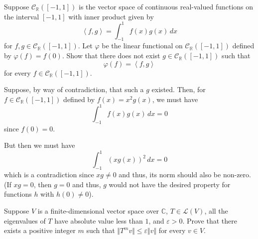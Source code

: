\documentclass[12pt, letterpaper]{hmcpset}
\begin{document}
\pagebreak

\begin{problem}[15.]
	Suppose $\mathcal C_{\mathbb R}([-1, 1])$ is the vector space of continuous real-valued functions on the interval $[-1, 1]$ with inner product given by
	\[
		\left < f, g \right > = \int_{-1}^1 f(x) g(x) \, dx
	\]
	for $f, g \in \mathcal C_{\mathbb R}([-1, 1])$. Let $\varphi$ be the linear functional on $\mathcal C_{\mathbb R}([-1, 1])$ defined by $\varphi(f) = f(0)$. Show that there does not exist $g \in \mathcal C_{\mathbb R}([-1, 1])$ such that
	\[
		\varphi(f) = \left < f, g \right >
	\]
	for every $f \in \mathcal C_{\mathbb R}([-1, 1])$.
\end{problem}

\begin{solution}
	Suppose, by way of contradiction, that such a $g$ existed. Then, for $f \in \mathcal{C}_{\mathbb{R}}([-1, 1])$ defined by $f(x) = x^{2} g(x)$, we must have
	\[
		\int_{-1}^{1} f(x) g(x) \, dx = 0
	\]
	since $f(0) = 0$.

	But then we must have
	\[
		\int_{-1}^{1} (x g(x))^{2} \, dx = 0
	\]
	which is a contradiction since $x g \neq 0$ and thus, its norm should also be non-zero. (If $x g = 0$, then $g = 0$ and thus, $g$ would not have the desired property for functions $h$ with $h(0) \neq 0$).
\end{solution}

\pagebreak

\begin{problem}[16.]
	Suppose $V$ is a finite-dimensional vector space over $\mathbb C$, $T \in \mathcal L(V)$, all the eigenvalues of $T$ have absolute value less than $1$, and $\varepsilon > 0$. Prove that there exists a positive integer $m$ such that $\Vert T^m v \Vert \le \varepsilon \Vert v \Vert$ for every $v \in V$.
\end{problem}
\end{document}
